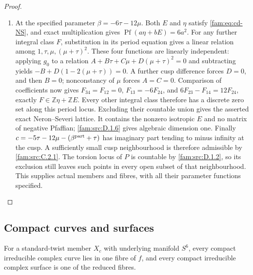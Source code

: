 \begin{proof}
\begin{enumerate}[label=\arabic*.,leftmargin=*]
\item At the specified parameter $\beta=-6\tau-12\mu$. Both $E$ and $\eta$
satisfy \eqref{fam:eq:cd-NS}, and exact multiplication gives
$\operatorname{Pf}(a\eta+bE)=6a^2$.
For any further integral class $F$, substitution in its period equation
gives a linear relation among $1,\tau,\mu,(\mu+\tau)^2$.
These four functions are linearly independent: applying $g_0$ to a
relation $A+B\tau+C\mu+D(\mu+\tau)^2=0$ and subtracting yields
$-B+D(1-2(\mu+\tau))=0$. A further cusp difference forces $D=0$,
and then $B=0$; nonconstancy of $\mu$ forces $A=C=0$.
Comparison of coefficients now gives
$F_{34}=F_{12}=0$, $F_{13}=-6F_{24}$, and
$6F_{23}-F_{14}=12F_{24}$, exactly
$F\in\mathbb Z\eta+\mathbb ZE$. Every other integral class therefore
has a discrete zero set along this period locus. Excluding their
countable union gives the asserted exact Neron--Severi lattice.
It contains the nonzero isotropic $E$ and no matrix of negative
Pfaffian; \ref{fam:src:D.1.6} gives algebraic dimension one.
Finally
$c=-5\tau-12\mu-(\beta^{\rm part}+\tau)$ has imaginary part tending
to minus infinity at the cusp. A sufficiently small cusp neighbourhood
is therefore admissible by \ref{fam:src:C.2.1}. The torsion locus of $P$ is countable
by \ref{fam:src:D.1.2}, so its exclusion still leaves such points in every open subset
of that neighbourhood. This supplies actual members and fibres, with
all their parameter functions specified.
\end{enumerate}
\end{proof}

\subsection{Compact curves and surfaces}\hypertarget{tag-01PR}{}\label{fam:section:D.2}
\begin{proposition}\hypertarget{tag-01QY}{}\label{fam:src:D.2.1}\label{fam:st:D.2.1}

For a standard-twist member \(X_c\) with underlying manifold \(S^6\),
every compact irreducible complex curve lies in one fibre of \(f\), and
every compact irreducible complex surface is one of the reduced fibres.
\end{proposition}


